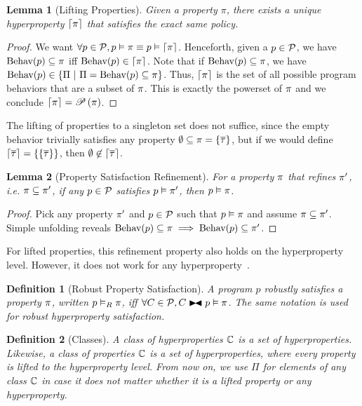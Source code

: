 \documentclass[a4paper,names,dvipsnames]{article}
\newtheorem{definition}{Definition}
\newtheorem{lemma}{Lemma}
\begin{document}
\begin{lemma}[Lifting Properties]
  Given a property $\pi$, there exists a unique hyperproperty $\left\lceil{\pi}\right\rceil$ that satisfies the exact same policy.
\end{lemma}
\begin{proof}
  We want $\forall p \in\mathcal{P}, {p}\vDash{\pi}\equiv{p}\vDash{\left\lceil{\pi}\right\rceil}$.
  Henceforth, given a $p\in\mathcal{P}$, we have $\text{Behav}({p})\subseteq\pi$ iff $\text{Behav}({p})\in\left\lceil{\pi}\right\rceil$.
  Note that if $\text{Behav}({p})\subseteq\pi$, we have $\behav{p}\in\left\{\Pi\ |\ \Pi=\behav{p}\subseteq\prop\right\}$.
  Thus, $\left\lceil{\pi}\right\rceil$ is the set of all possible program behaviors that are a subset of $\pi$.
  This is exactly the powerset of $\pi$ and we conclude $\left\lceil{\pi}\right\rceil=\mathscr{P}\left({\pi}\right)$.
\end{proof}
\noindent
The lifting of properties to a singleton set does not suffice, since the empty behavior trivially satisfies any property $\emptyset\subseteq\pi=\{\overline{\tau}\}$, but if we would define $\left\lceil{\overline{\tau}}\right\rceil=\{\{\overline{\tau}\}\}$, then $\emptyset\not\in\left\lceil{\overline{\tau}}\right\rceil$.

\begin{lemma}[Property Satisfaction Refinement]
  For a property $\pi$ that refines $\pi'$, i.e. $\pi\subseteq\pi'$, if any $p\in\mathcal{P}$ satisfies ${p}\vDash{\pi'}$, then ${p}\vDash{\pi}$.
\end{lemma}
\begin{proof}
  Pick any property $\pi'$ and $p\in\mathcal{P}$ such that ${p}\vDash{\pi}$ and assume $\pi\subseteq\pi'$.
  Simple unfolding reveals $\text{Behav}({p})\subseteq\pi\implies\text{Behav}({p})\subseteq\pi'$.
\end{proof}
\noindent
For lifted properties, this refinement property also holds on the hyperproperty level.
However, it does not work for any hyperproperty~\cite{clarkson08}.

\begin{definition}[Robust Property Satisfaction]
  A program $p$ robustly satisfies a property $\pi$, written ${p}\vDash_{\scriptstyle R}{\pi}$, iff $\forall C\in\partials,\sat{C\linker p}{\prop}$. The same notation is used for robust hyperproperty satisfaction.
\end{definition}

\begin{definition}[Classes]
  A class of hyperproperties $\mathbb{C}$ is a set of hyperproperties.
  Likewise, a class of properties $\mathbb{C}$ is a set of hyperproperties, where every property is lifted to the hyperproperty level.
  From now on, we use $\Pi$ for elements of any class $\mathbb{C}$ in case it does not matter whether it is a lifted property or any hyperproperty.
\end{definition}
\end{document}
